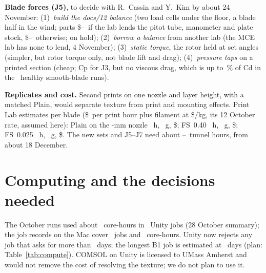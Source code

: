\documentclass[10pt]{article}
\begin{document}
\textbf{Blade forces (J5)}, to decide with R.\ Cassin and Y.\ Kim by about 24 November:
(1)~\emph{build the docs/12 balance} (two load cells under the floor, a blade half in the wind; parts \$\nBalLentLo--\nBalLentHi\ if the lab lends the pitot tube, manometer and plate
stock, \$\nBalLo--\nBalHi\ otherwise; on hold); (2)~\emph{borrow a balance} from another lab (the MCE lab
has none to lend, 4 November);
(3)~\emph{static torque}, the rotor held at set angles (simpler, but rotor torque only, not blade lift and
drag); (4)~\emph{pressure taps} on a printed section (cheap; Cp for J3, but no viscous drag, which is up to
\nPressViscMax\,\% of Cd in the \nHealthyRuns\ healthy smooth-blade runs).

\textbf{Replicates and cost.} Second prints on one nozzle and layer height, with a matched Plain, would
separate texture from print and mounting effects. Print Lab estimates per blade
(\$\nPrintRate\ per print hour plus filament at \$\nFilament/kg, its 12 October rate, assumed here): Plain on
the \nNozzleLarge-mm nozzle \nPrintPlainFourH~h, \nPrintPlainFourG~g, \$\nPrintPlainFourUsd; FS~0.40
\nPrintFsFortyH~h, \nPrintFsFortyG~g, \$\nPrintFsFortyUsd; FS~0.025 \nPrintFsQuarterH~h, \nPrintFsQuarterG~g,
\$\nPrintFsQuarterUsd. The new sets and J5--J7 need about \nTunnelLo--\nTunnelHi\ tunnel hours, from about
18 December.

\section{Computing and the decisions needed}\label{sec:computing}
The October runs used about \nOctCoreH\ core-hours in \nOctJobs\ Unity jobs (28 October summary); the job
records on the Mac cover \nLocalJobs\ jobs and \nLocalCoreH\ core-hours. Unity now rejects any job that
asks for more than \nUnityDays\ days; the longest B1 job is estimated at \nBoneLongestDays\ days
(plan: Table~\ref{tab:compute}). COMSOL on Unity is licensed to UMass Amherst and would not remove the cost
of resolving the texture; we do not plan to use it.
\end{document}
